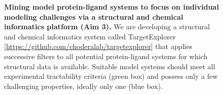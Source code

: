 \documentclass[11pt]{article}
\begin{document}
\begin{figure}
\vspace{-0.25in}
\begin{centering}
\vspace{-0.15in}
\end{centering}
\footnotesize
\caption{\label{figure:mining-for-model-systems}  
\textbf{Mining model protein-ligand systems to focus on individual modeling challenges via a structural and chemical informatics platform (Aim 3).}
We are developing a structural and chemical informatics system called TargetExplorer [\url{https://github.com/choderalab/targetexplorer}] that applies successive filters to all potential protein-ligand systems for which structural data is available. 
Suitable model systems should meet all experimental tractability criteria (green box) and possess only a few challenging properties, ideally only one (blue box).
}
\end{figure}
\end{document}
